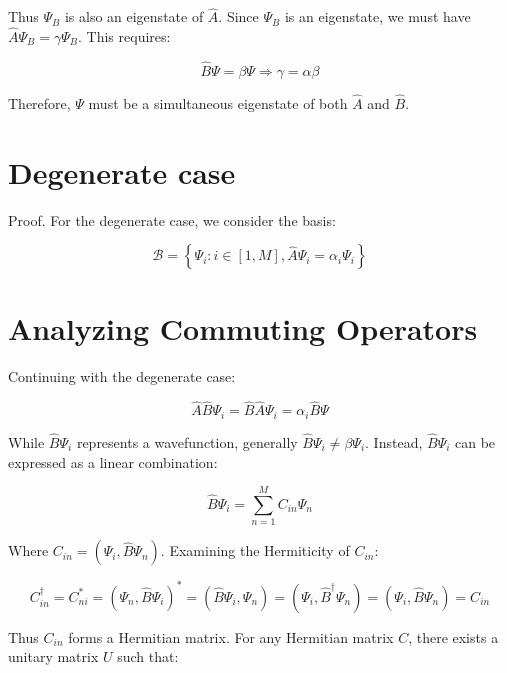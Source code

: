 Thus $\Psi_{B}$ is also an eigenstate of $\hat{A}$. Since $\Psi_B$ is an eigenstate, we must have $\hat{A} \Psi_{B}=\gamma \Psi_{B}$. This requires:

\begin{equation}
\hat{B} \Psi=\beta \Psi \Longrightarrow \gamma=\alpha \beta
\end{equation}

Therefore, $\Psi$ must be a simultaneous eigenstate of both $\hat{A}$ and $\hat{B}$.

\section{Degenerate case}
Proof. For the degenerate case, we consider the basis:

\begin{equation}
\mathcal{B}=\left\{\Psi_{i}: i \in[1, M], \hat{A} \Psi_{i}=\alpha_{i} \Psi_{i}\right\}
\end{equation}


\section{Analyzing Commuting Operators}
Continuing with the degenerate case:

\begin{equation}
\hat{A} \hat{B} \Psi_{i}=\hat{B} \hat{A} \Psi_{i}=\alpha_{i} \hat{B} \Psi
\end{equation}

While $\hat{B} \Psi_{i}$ represents a wavefunction, generally $\hat{B} \Psi_{i} \neq \beta \Psi_{i}$. Instead, $\hat{B} \Psi_{i}$ can be expressed as a linear combination:

\begin{equation}
\hat{B} \Psi_{i}=\sum_{n=1}^{M} C_{i n} \Psi_{n}
\end{equation}

Where $C_{i n}=\left(\Psi_{i}, \hat{B} \Psi_{n}\right)$. Examining the Hermiticity of $C_{in}$:

\begin{equation}
C_{i n}^{\dagger}=C_{n i}^{*}=\left(\Psi_{n}, \hat{B} \Psi_{i}\right)^{*}=\left(\hat{B} \Psi_{i}, \Psi_{n}\right)=\left(\Psi_{i}, \hat{B}^{\dagger} \Psi_{n}\right)=\left(\Psi_{i}, \hat{B} \Psi_{n}\right)=C_{i n}
\end{equation}

Thus $C_{i n}$ forms a Hermitian matrix. For any Hermitian matrix $C$, there exists a unitary matrix $U$ such that:

